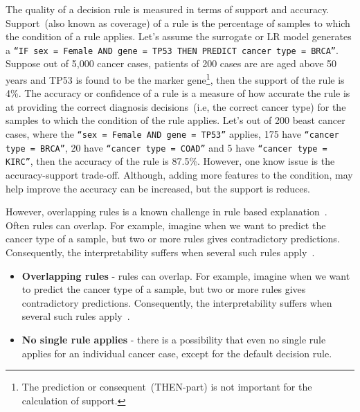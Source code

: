 \hspace*{3.5mm} The quality of a decision rule is measured in terms of support and accuracy. Support~(also known as coverage) of a rule is the percentage of samples to which the condition of a rule applies. Let's assume the surrogate or LR model generates a \texttt{``IF sex = Female AND gene = TP53 THEN PREDICT cancer type = BRCA''}. Suppose out of 5,000 cancer cases, patients of 200 cases are are aged above 50 years and TP53 is found to be the marker gene\footnote{The prediction or consequent~(THEN-part) is not important for the calculation of support.}, then the support of the rule is 4\%. 
The accuracy or confidence of a rule is a measure of how accurate the rule is at providing the correct diagnosis decisions~(i.e, the correct cancer type) for the samples to which the condition of the rule applies. Let's out of 200 beast cancer cases, where the \texttt{``sex = Female AND gene = TP53''} applies, 175 have \texttt{``cancer type = BRCA''}, 20 have \texttt{``cancer type = COAD''} and 5 have \texttt{``cancer type = KIRC''}, then the accuracy of the rule is 87.5\%. 
However, one know issue is the accuracy-support trade-off. Although, adding more features to the condition, may help improve the accuracy can be increased, but the support is reduces.

\hspace*{3.5mm} However, overlapping rules is a known challenge in rule based explanation~\cite{molnar2019interpretable}. Often rules can overlap. For example, imagine when we want to predict the cancer type of a sample, but two or more rules gives contradictory predictions. Consequently, the interpretability suffers when several such rules apply~\cite{molnar2019interpretable}. 

\begin{itemize}[noitemsep]
    \item \textbf{Overlapping rules} - rules can overlap. For example, imagine when we want to predict the cancer type of a sample, but two or more rules gives contradictory predictions. Consequently, the interpretability suffers when several such rules apply~\cite{molnar2019interpretable}. 
    \item \textbf{No single rule applies} - there is a possibility that even no single rule applies for an individual cancer case, except for the default decision rule.  
\end{itemize}

